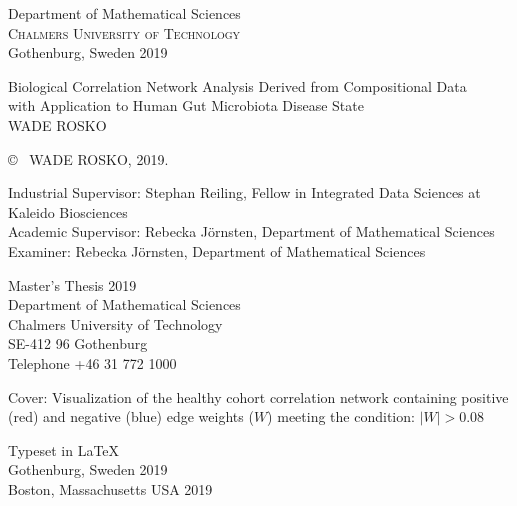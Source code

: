 \begin{center}
	Department of Mathematical Sciences \\
	\textsc{Chalmers University of Technology} \\
	Gothenburg, Sweden 2019 \\
\end{center}

	
	


\newpage
\thispagestyle{plain}
\vspace*{4.5cm}


Biological Correlation Network Analysis Derived from Compositional Data \\
with Application to Human Gut Microbiota Disease State \\
WADE ROSKO \setlength{\parskip}{1cm}

\copyright ~ WADE ROSKO, 2019. \setlength{\parskip}{1cm}

Industrial Supervisor: Stephan Reiling, Fellow in Integrated Data Sciences at Kaleido Biosciences\\
Academic Supervisor: Rebecka Jörnsten, Department of Mathematical Sciences\\
Examiner: Rebecka Jörnsten, Department of Mathematical Sciences \setlength{\parskip}{1cm}

Master's Thesis 2019\\	%
Department of Mathematical Sciences\\
Chalmers University of Technology\\
SE-412 96 Gothenburg\\
Telephone +46 31 772 1000 \setlength{\parskip}{0.5cm}

\vfill
Cover: Visualization of the healthy cohort correlation network containing positive (red) and negative (blue) edge weights ($W$) meeting the condition: $\left| W\right| > 0.08$ \setlength{\parskip}{0.5cm}

Typeset in \LaTeX \\
Gothenburg, Sweden 2019 \\
Boston, Massachusetts USA 2019

